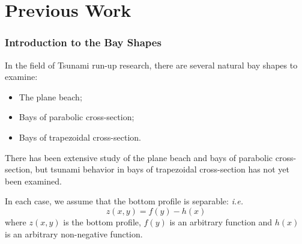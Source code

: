 

\section{Previous Work}
	\begin{frame}
		\frametitle{Introduction to the Bay Shapes}
		In the field of Tsunami run-up research, there are several natural bay shapes to examine:
		\begin{itemize}
			\item The plane beach;
			\item Bays of parabolic cross-section;
			\item Bays of trapezoidal cross-section.
		\end{itemize}
		There has been extensive study of the plane beach and bays of parabolic cross-section, but tsunami behavior in bays of trapezoidal cross-section has not yet been examined.
		
		In each case, we assume that the bottom profile is separable: \emph{i.e.}
		\[   z(x,y) = f(y) - h(x)  \]
		where $z(x,y)$ is the bottom profile, $f(y)$ is an arbitrary function and $h(x)$ is an arbitrary non-negative function.
	\end{frame}


